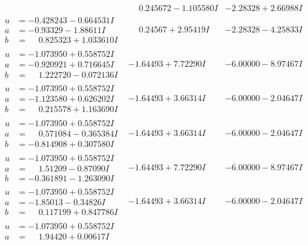 \documentclass[1p]{elsarticle_modified}
\theoremstyle{definition}
\begin{document}
$$\begin{array}{c|c|c}
 & \phantom{-}0.245672 - 1.105580 I & -2.28328 + 2.66988 I \\ \hline\begin{aligned}
u &= -0.428243 - 0.664531 I \\
a &= -0.93329 - 1.88611 I \\
b &= \phantom{-}0.825323 + 1.033610 I\end{aligned}
 & \phantom{-}0.24567 + 2.95419 I & -2.28328 - 4.25833 I \\ \hline\begin{aligned}
u &= -1.073950 + 0.558752 I \\
a &= -0.920921 + 0.716645 I \\
b &= \phantom{-}1.222720 - 0.072136 I\end{aligned}
 & -1.64493 + 7.72290 I & -6.00000 - 8.97467 I \\ \hline\begin{aligned}
u &= -1.073950 + 0.558752 I \\
a &= -1.123580 + 0.626202 I \\
b &= \phantom{-}0.215578 + 1.163690 I\end{aligned}
 & -1.64493 + 3.66314 I & -6.00000 - 2.04647 I \\ \hline\begin{aligned}
u &= -1.073950 + 0.558752 I \\
a &= \phantom{-}0.571084 - 0.365384 I \\
b &= -0.814908 + 0.307580 I\end{aligned}
 & -1.64493 + 3.66314 I & -6.00000 - 2.04647 I \\ \hline\begin{aligned}
u &= -1.073950 + 0.558752 I \\
a &= \phantom{-}1.51209 - 0.87090 I \\
b &= -0.361891 - 1.263090 I\end{aligned}
 & -1.64493 + 7.72290 I & -6.00000 - 8.97467 I \\ \hline\begin{aligned}
u &= -1.073950 + 0.558752 I \\
a &= -1.85013 - 0.34826 I \\
b &= \phantom{-}0.117199 + 0.847786 I\end{aligned}
 & -1.64493 + 3.66314 I & -6.00000 - 2.04647 I \\ \hline\begin{aligned}
u &= -1.073950 + 0.558752 I \\
a &= \phantom{-}1.94420 + 0.00617 I \\

\end{aligned}
\end{array}$$
\end{document}
